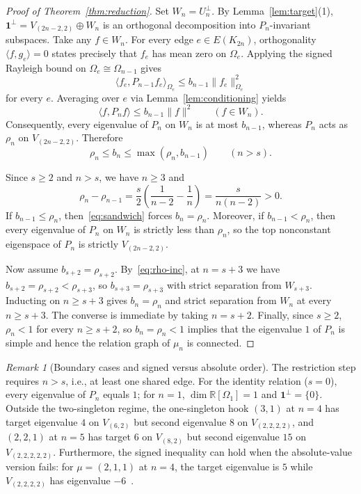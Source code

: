 \documentclass[11pt]{article}
\theoremstyle{remark}
\newtheorem{remark}[theorem]{Remark}
\newcommand{\R}{\mathbb{R}}
\newcommand{\one}{\mathbf{1}}
\begin{document}
\begin{proof}[Proof of Theorem~\ref{thm:reduction}]
Set $W_n = U_n^\perp$. By Lemma~\ref{lem:target}(1),
$\one^\perp = V_{(2n-2,2)} \oplus W_n$ is an orthogonal decomposition into
$P_n$-invariant subspaces. Take any $f \in W_n$. For every edge
$e \in E(K_{2n})$, orthogonality $\langle f, g_e \rangle = 0$ states precisely
that $f_e$ has mean zero on $\Omega_e$. Applying the signed Rayleigh bound on
$\Omega_e \cong \Omega_{n-1}$ gives
\[
  \langle f_e, P_{n-1} f_e \rangle_{\Omega_e} \le b_{n-1} \|f_e\|_{\Omega_e}^2
\]
for every $e$. Averaging over $e$ via Lemma~\ref{lem:conditioning} yields
\[
  \langle f, P_n f \rangle \le b_{n-1} \|f\|^2 \qquad (f \in W_n).
\]
Consequently, every eigenvalue of $P_n$ on $W_n$ is at most $b_{n-1}$, whereas
$P_n$ acts as $\rho_n$ on $V_{(2n-2,2)}$. Therefore
\begin{equation}\label{eq:sandwich}
  \rho_n \le b_n \le \max(\rho_n, b_{n-1}) \qquad (n > s).
\end{equation}

Since $s \ge 2$ and $n > s$, we have $n \ge 3$ and
\begin{equation}\label{eq:rho-inc}
  \rho_n - \rho_{n-1}
  = \frac{s}{2}\left(\frac{1}{n-2} - \frac{1}{n}\right)
  = \frac{s}{n(n-2)} > 0.
\end{equation}
If $b_{n-1} \le \rho_n$, then~\eqref{eq:sandwich} forces $b_n = \rho_n$.
Moreover, if $b_{n-1} < \rho_n$, then every eigenvalue of $P_n$ on $W_n$ is
strictly less than $\rho_n$, so the top nonconstant eigenspace of $P_n$ is
strictly $V_{(2n-2,2)}$.

Now assume $b_{s+2} = \rho_{s+2}$. By~\eqref{eq:rho-inc}, at $n = s+3$ we have
$b_{s+2} = \rho_{s+2} < \rho_{s+3}$, so $b_{s+3} = \rho_{s+3}$ with strict
separation from $W_{s+3}$. Inducting on $n \ge s+3$ gives $b_n = \rho_n$ and
strict separation from $W_n$ at every $n \ge s+3$. The converse is immediate by
taking $n = s+2$. Finally, since $s \ge 2$, $\rho_n < 1$ for every $n \ge s+2$,
so $b_n = \rho_n < 1$ implies that the eigenvalue $1$ of $P_n$ is simple and
hence the relation graph of $\mu_n$ is connected.
\end{proof}

\begin{remark}[Boundary cases and signed versus absolute order]\label{rem:boundaries}
The restriction step requires $n > s$, i.e., at least one shared edge. For the
identity relation ($s = 0$), every eigenvalue of $P_n$ equals $1$; for $n = 1$,
$\dim \R[\Omega_1] = 1$ and $\one^\perp = \{0\}$. Outside the two-singleton
regime, the one-singleton hook $(3, 1)$ at $n = 4$ has target eigenvalue $4$ on
$V_{(6,2)}$ but second eigenvalue $8$ on $V_{(2,2,2,2)}$, and $(2, 2, 1)$ at
$n = 5$ has target $6$ on $V_{(8,2)}$ but second eigenvalue $15$ on
$V_{(2,2,2,2,2)}$. Furthermore, the signed inequality can hold when the
absolute-value version fails: for $\mu = (2, 1, 1)$ at $n = 4$, the target
eigenvalue is $5$ while $V_{(2,2,2,2)}$ has eigenvalue $-6$~\cite[Appendix~A,
Tables~5--6]{GuptaEtAl}.
\end{remark}
\end{document}
